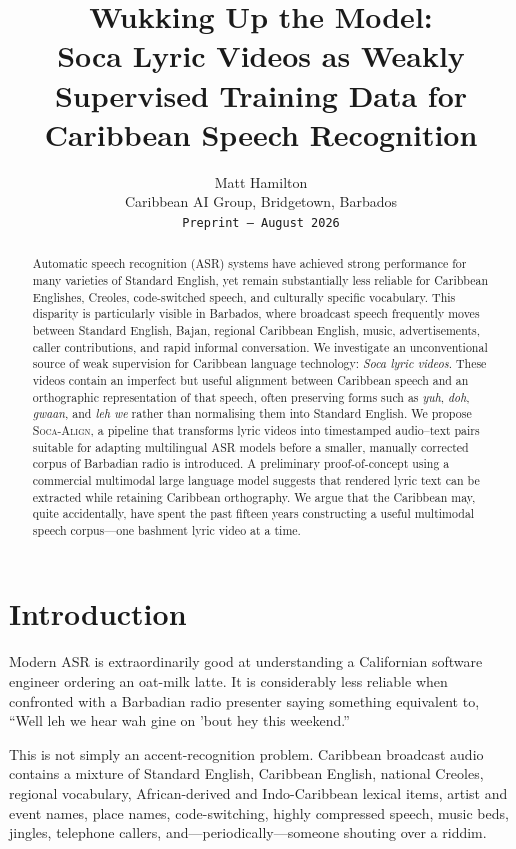 \documentclass[10pt,twocolumn]{article}
\title{\vspace{-1.1cm}\textbf{Wukking Up the Model:}\\[0.2em]
\Large Soca Lyric Videos as Weakly Supervised Training Data for Caribbean Speech Recognition}
\author{Matt Hamilton\\\small Caribbean AI Group, Bridgetown, Barbados\\\small \texttt{Preprint -- August 2026}}
\date{}
\begin{document}
\maketitle
\vspace{-1.0em}

\begin{abstract}
Automatic speech recognition (ASR) systems have achieved strong performance for many varieties of Standard English, yet remain substantially less reliable for Caribbean Englishes, Creoles, code-switched speech, and culturally specific vocabulary. This disparity is particularly visible in Barbados, where broadcast speech frequently moves between Standard English, Bajan, regional Caribbean English, music, advertisements, caller contributions, and rapid informal conversation. We investigate an unconventional source of weak supervision for Caribbean language technology: \emph{Soca lyric videos}. These videos contain an imperfect but useful alignment between Caribbean speech and an orthographic representation of that speech, often preserving forms such as \emph{yuh}, \emph{doh}, \emph{gwaan}, and \emph{leh we} rather than normalising them into Standard English. We propose \textsc{Soca-Align}, a pipeline that transforms lyric videos into timestamped audio--text pairs suitable for adapting multilingual ASR models before a smaller, manually corrected corpus of Barbadian radio is introduced. A preliminary proof-of-concept using a commercial multimodal large language model suggests that rendered lyric text can be extracted while retaining Caribbean orthography. We argue that the Caribbean may, quite accidentally, have spent the past fifteen years constructing a useful multimodal speech corpus---one bashment lyric video at a time.
\end{abstract}

\section{Introduction}
Modern ASR is extraordinarily good at understanding a Californian software engineer ordering an oat-milk latte. It is considerably less reliable when confronted with a Barbadian radio presenter saying something equivalent to, ``Well leh we hear wah gine on 'bout hey this weekend.''

This is not simply an accent-recognition problem. Caribbean broadcast audio contains a mixture of Standard English, Caribbean English, national Creoles, regional vocabulary, African-derived and Indo-Caribbean lexical items, artist and event names, place names, code-switching, highly compressed speech, music beds, jingles, telephone callers, and---periodically---someone shouting over a riddim.
\end{document}
